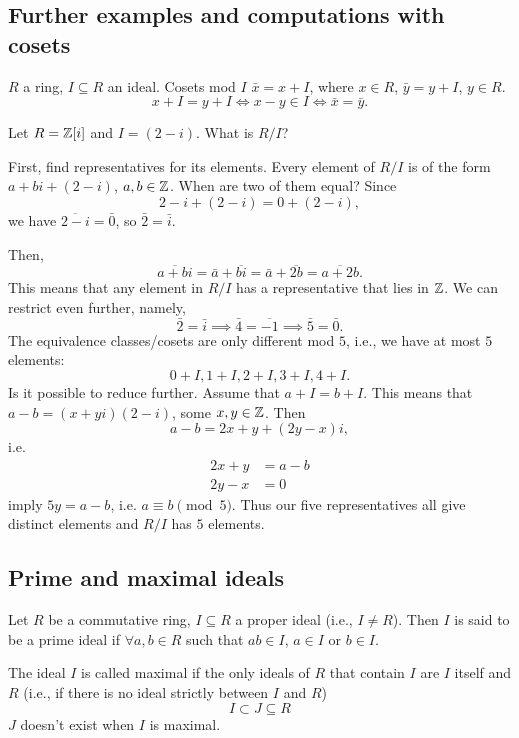 \documentclass[10pt, a4paper]{article}
\begin{document}
\subsection{Further examples and computations with cosets}
$R$ a ring,
$I \subseteq R$ an ideal.
Cosets mod $I$ $\bar{x} = x + I$,
where $x \in R$,
$\bar{y} = y + I$,
$y \in R$.
\[
x + I = y + I \iff x - y \in I \iff \bar{x} = \bar{y}.
\]

\begin{example}
    Let $R = \mathbb{Z}[i]$ and $I = (2 - i)$.
    What is $R / I$?

    First,
    find representatives for its elements.
    Every element of $R / I$ is of the form $a + bi + (2 - i)$,
    $a, b \in \mathbb{Z}$.
    When are two of them equal?
    Since
    \[
    2 - i + (2 - i) = 0 + (2 - i),
    \]
    we have $\overline{2 - i} = \bar{0}$,
    so $\bar{2} = \bar{i}$.

    Then,
    \[
    \overline{a + bi} = \bar{a} + \overline{bi} = \bar{a} + \overline{2b} = \overline{a + 2b}.
    \]
    This means that any element in $R / I$ has a representative that lies in $\mathbb{Z}$.
    We can restrict even further,
    namely,
    \[
    \bar{2} = \bar{i} \implies \bar{4} = \overline{-1} \implies \bar{5} = \bar{0}.
    \]
    The equivalence classes/cosets are only different mod $5$,
    i.e.,
    we have at most $5$ elements:
    \[
    0 + I, 1 + I, 2 + I, 3 + I, 4 + I.
    \]
    Is it possible to reduce further.
    Assume that $a + I = b + I$.
    This means that $a - b = (x + yi)(2 - i)$,
    some $x, y \in \mathbb{Z}$.
    Then
    \[
    a - b = 2x + y + (2y - x)i,
    \]
    i.e.
    \begin{align*}
        2x + y &= a - b \\
        2y - x &= 0
    \end{align*}
    imply $5y = a - b$,
    i.e. $a \equiv b\pmod{5}$.
    Thus our five representatives all give distinct elements and $R / I$ has $5$ elements.
\end{example}

\subsection{Prime and maximal ideals}
\begin{definition}
    Let $R$ be a commutative ring,
    $I \subseteq R$ a proper ideal
    (i.e.,
    $I \neq R$).
    Then $I$ is said to be a prime ideal if $\forall a, b \in R$ such that $ab \in I$,
    $a \in I$ or $b \in I$.
    
    The ideal $I$ is called maximal if the only ideals of $R$ that contain $I$ are $I$ itself and $R$
    (i.e.,
    if there is no ideal strictly between $I$ and $R$)
    \[
    I \subset J \subseteq R
    \]
    $J$ doesn't exist when $I$ is maximal.
\end{definition}
\end{document}

